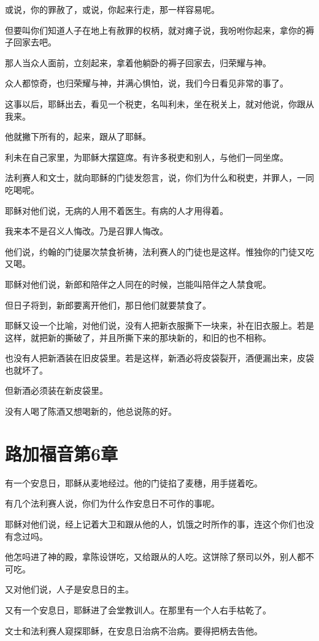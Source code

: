 \documentclass[12pt,oneside]{book}
\begin{document}
或说，你的罪赦了，或说，你起来行走，那一样容易呢。

但要叫你们知道人子在地上有赦罪的权柄，就对瘫子说，我吩咐你起来，拿你的褥子回家去吧。

那人当众人面前，立刻起来，拿着他躺卧的褥子回家去，归荣耀与神。

众人都惊奇，也归荣耀与神，并满心惧怕，说，我们今日看见非常的事了。

这事以后，耶稣出去，看见一个税吏，名叫利未，坐在税关上，就对他说，你跟从我来。

他就撇下所有的，起来，跟从了耶稣。

利未在自己家里，为耶稣大摆筵席。有许多税吏和别人，与他们一同坐席。

法利赛人和文士，就向耶稣的门徒发怨言，说，你们为什么和税吏，并罪人，一同吃喝呢。

耶稣对他们说，无病的人用不着医生。有病的人才用得着。

我来本不是召义人悔改。乃是召罪人悔改。

他们说，约翰的门徒屡次禁食祈祷，法利赛人的门徒也是这样。惟独你的门徒又吃又喝。

耶稣对他们说，新郎和陪伴之人同在的时候，岂能叫陪伴之人禁食呢。

但日子将到，新郎要离开他们，那日他们就要禁食了。

耶稣又设一个比喻，对他们说，没有人把新衣服撕下一块来，补在旧衣服上。若是这样，就把新的撕破了，并且所撕下来的那块新的，和旧的也不相称。

也没有人把新酒装在旧皮袋里。若是这样，新酒必将皮袋裂开，酒便漏出来，皮袋也就坏了。

但新酒必须装在新皮袋里。

没有人喝了陈酒又想喝新的，他总说陈的好。

\chapter{路加福音第6章}
有一个安息日，耶稣从麦地经过。他的门徒掐了麦穗，用手搓着吃。

有几个法利赛人说，你们为什么作安息日不可作的事呢。

耶稣对他们说，经上记着大卫和跟从他的人，饥饿之时所作的事，连这个你们也没有念过吗。

他怎吗进了神的殿，拿陈设饼吃，又给跟从的人吃。这饼除了祭司以外，别人都不可吃。

又对他们说，人子是安息日的主。

又有一个安息日，耶稣进了会堂教训人。在那里有一个人右手枯乾了。

文士和法利赛人窥探耶稣，在安息日治病不治病。要得把柄去告他。
\end{document}
